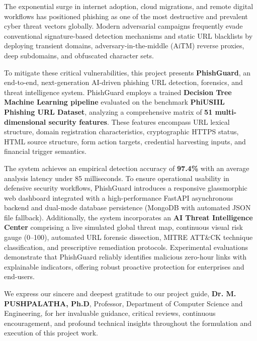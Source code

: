 \documentclass[BTech]{srmuthesis}
\begin{document}
\abstract
\begin{doublespacing}
{\large
The exponential surge in internet adoption, cloud migrations, and remote digital workflows has positioned phishing as one of the most destructive and prevalent cyber threat vectors globally. Modern adversarial campaigns frequently evade conventional signature-based detection mechanisms and static URL blacklists by deploying transient domains, adversary-in-the-middle (AiTM) reverse proxies, deep subdomains, and obfuscated character sets.

To mitigate these critical vulnerabilities, this project presents \textbf{PhishGuard}, an end-to-end, next-generation AI-driven phishing URL detection, forensics, and threat intelligence system. PhishGuard employs a trained \textbf{Decision Tree Machine Learning pipeline} evaluated on the benchmark \textbf{PhiUSIIL Phishing URL Dataset}, analyzing a comprehensive matrix of \textbf{51 multi-dimensional security features}. These features encompass URL lexical structure, domain registration characteristics, cryptographic HTTPS status, HTML source structure, form action targets, credential harvesting inputs, and financial trigger semantics.

The system achieves an empirical detection accuracy of \textbf{97.4\%} with an average analysis latency under 85 milliseconds. To ensure operational usability in defensive security workflows, PhishGuard introduces a responsive glassmorphic web dashboard integrated with a high-performance FastAPI asynchronous backend and dual-mode database persistence (MongoDB with automated JSON file fallback). Additionally, the system incorporates an \textbf{AI Threat Intelligence Center} comprising a live simulated global threat map, continuous visual risk gauge (0--100), automated URL forensic dissection, MITRE ATT\&CK technique classification, and prescriptive remediation protocols. Experimental evaluations demonstrate that PhishGuard reliably identifies malicious zero-hour links with explainable indicators, offering robust proactive protection for enterprises and end-users.
}
\end{doublespacing}

\pagebreak
\acknowledgements
We express our sincere and deepest gratitude to our project guide, \textbf{Dr. M. PUSHPALATHA, Ph.D}, Professor, Department of Computer Science and Engineering, for her invaluable guidance, critical reviews, continuous encouragement, and profound technical insights throughout the formulation and execution of this project work.
\end{document}
